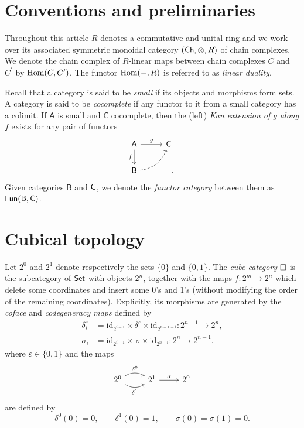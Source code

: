 
\section{Conventions and preliminaries}

Throughout this article $R$ denotes a commutative and unital ring and we work over its associated symmetric monoidal category $(\mathsf{Ch}, \otimes, R)$ of chain complexes.
We denote the chain complex of $R$-linear maps between chain complexes $C$ and $C^\prime$ by $\mathrm{Hom}(C, C^\prime)$.
The functor $\mathrm{Hom}(-, R)$ is referred to as \textit{linear duality}.

Recall that a category is said to be \textit{small} if its objects and morphisms form sets. A category is said to be \textit{cocomplete} if any functor to it from a small category has a colimit.
If $\mathsf{A}$ is small and $\mathsf{C}$ cocomplete, then the (left) \textit{Kan extension of $g$ along $f$} exists for any pair of functors
\begin{equation*}
\begin{tikzcd}[column sep=normal, row sep=normal]
\mathsf{A} \arrow[d, "f"'] \arrow[r, "g"] & \mathsf{C} \\ 
\mathsf{B} \arrow[dashed, ur, bend right] & \quad .
\end{tikzcd}
\end{equation*}
Given categories $\mathsf{B}$ and $\mathsf{C}$, we denote the \textit{functor category} between them as $\mathsf{Fun}(\mathsf{B}, \mathsf{C})$.

\section{Cubical topology}

Let $2^0$ and $2^1$ denote respectively the sets $\{0\}$ and $\{0,1\}$.
The \textit{cube category} $\square$ is the subcategory of $\mathsf{Set}$ with objects $2^n$, together with the maps $f \colon 2^m \to 2^n$ which delete some coordinates and insert some 0’s and 1’s (without modifying the order of the remaining coordinates).
Explicitly, its morphisms are generated by the \textit{coface} and \textit{codegeneracy maps} defined by
\begin{align*}
\delta_i^\varepsilon & = \mathrm{id}_{2^{i-1}} \times \delta^\varepsilon \times \mathrm{id}_{2^{n-1-i}} \colon 2^{n-1} \to 2^n, \\
\sigma_i & = \mathrm{id}_{2^{i-1}} \times \, \sigma \times \mathrm{id}_{2^{n-i}} \colon 2^{n} \to 2^{n-1}.
\end{align*}
where $\varepsilon \in \{0,1\}$ and the maps
\begin{equation*}
\begin{tikzcd}
2^0 \arrow[r, bend left, "\delta^0"] \arrow[r, bend right, "\delta^1"'] & 2^1 \arrow[r, "\sigma"] & 2^0
\end{tikzcd}
\end{equation*}
are defined by
\begin{equation*}
\delta^0(0) = 0, \qquad \delta^1(0) = 1, \qquad \sigma(0) = \sigma(1) = 0.
\end{equation*}


